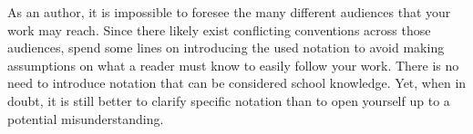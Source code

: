 


\noindent
As an author, it is impossible to foresee the many different audiences that your work may reach.
Since there likely exist conflicting conventions across those audiences, spend some lines on introducing the used notation  to avoid making assumptions on what a reader must know to easily follow your work.
There is no need to introduce notation that can be considered school knowledge.
Yet, when in doubt, it is still better to clarify specific notation than to open yourself up to a potential misunderstanding.
